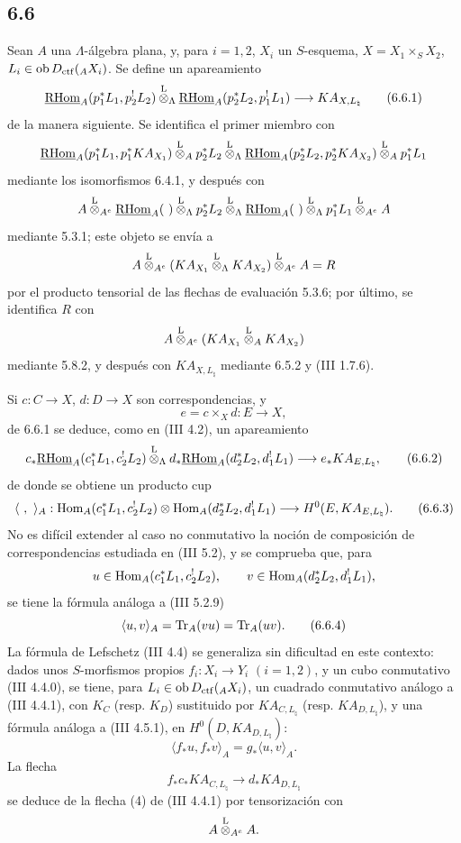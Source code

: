 \subsection*{6.6}
Sean $A$ una $\Lambda$-álgebra plana, y, para $i=1,2$, $X_i$ un $S$-esquema, $X=X_1\times_SX_2$, $L_i\in\operatorname{ob} D_{\mathrm{ctf}}({}_AX_i)$. Se define un apareamiento
\begin{equation}
\underline{\mathrm{RHom}}_A(p_1^*L_1,p_2^!L_2)
\overset{\mathrm L}{\otimes}_{\Lambda}
\underline{\mathrm{RHom}}_A(p_2^*L_2,p_1^!L_1)
\longrightarrow
KA_{X,L_{\natural}}
\tag{6.6.1}
\end{equation}
de la manera siguiente. Se identifica el primer miembro con
\[
\underline{\mathrm{RHom}}_A(p_1^*L_1,p_1^*KA_{X_1})
\overset{\mathrm L}{\otimes}_A p_2^*L_2
\overset{\mathrm L}{\otimes}_{\Lambda}
\underline{\mathrm{RHom}}_A(p_2^*L_2,p_2^*KA_{X_2})
\overset{\mathrm L}{\otimes}_A p_1^*L_1
\]
mediante los isomorfismos 6.4.1, y después con
\[
A\lten_{A^e}\uRHom_A(\ )\lten_{\Lambda}p_2^*L_2
 \lten_{\Lambda}\uRHom_A(\ )\lten_{\Lambda}p_1^*L_1\lten_{A^e}A
\]
mediante 5.3.1; este objeto se envía a
\[
A\overset{\mathrm L}{\otimes}_{A^e}(KA_{X_1}\overset{\mathrm L}{\otimes}_{\Lambda}KA_{X_2})\overset{\mathrm L}{\otimes}_{A^e}A=R
\]
por el producto tensorial de las flechas de evaluación 5.3.6; por último, se identifica $R$ con
\[
A\overset{\mathrm L}{\otimes}_{A^e}(KA_{X_1}\overset{\mathrm L}{\otimes}_A KA_{X_2})
\]
mediante 5.8.2, y después con $KA_{X,L_{\natural}}$ mediante 6.5.2 y (III 1.7.6).

Si $c:C\to X$, $d:D\to X$ son correspondencias, y
\[
e=c\times_Xd:E\to X,
\]
de 6.6.1 se deduce, como en (III 4.2), un apareamiento
\begin{equation}
c_*\underline{\mathrm{RHom}}_A(c_1^*L_1,c_2^!L_2)
\overset{\mathrm L}{\otimes}_{\Lambda}
d_*\underline{\mathrm{RHom}}_A(d_2^*L_2,d_1^!L_1)
\longrightarrow
e_*KA_{E,L_{\natural}},
\tag{6.6.2}
\end{equation}
de donde se obtiene un producto cup
\begin{equation}
\langle\ ,\ \rangle_A:
\operatorname{Hom}_A(c_1^*L_1,c_2^!L_2)\otimes
\operatorname{Hom}_A(d_2^*L_2,d_1^!L_1)
\longrightarrow
H^0(E,KA_{E,L_{\natural}}).
\tag{6.6.3}
\end{equation}
No es difícil extender al caso no conmutativo la noción de composición de correspondencias estudiada en (III 5.2), y se comprueba que, para
\[
u\in\operatorname{Hom}_A(c_1^*L_1,c_2^!L_2),\qquad
v\in\operatorname{Hom}_A(d_2^*L_2,d_1^!L_1),
\]
se tiene la fórmula análoga a (III 5.2.9)
\begin{equation}
\langle u,v\rangle_A=\operatorname{Tr}_A(vu)=\operatorname{Tr}_A(uv).
\tag{6.6.4}
\end{equation}
La fórmula de Lefschetz (III 4.4) se generaliza sin dificultad en este contexto: dados unos $S$-morfismos propios $f_i:X_i\to Y_i$ $(i=1,2)$, y un cubo conmutativo (III 4.4.0), se tiene, para $L_i\in\operatorname{ob} D_{\mathrm{ctf}}({}_AX_i)$, un cuadrado conmutativo análogo a (III 4.4.1), con $K_C$ (resp. $K_D$) sustituido por $KA_{C,L_{\natural}}$ (resp. $KA_{D,L_{\natural}}$), y una fórmula análoga a (III 4.5.1), en $H^0(D,KA_{D,L_{\natural}})$:
\begin{equation}
\langle f_*u,f_*v\rangle_A=g_*\langle u,v\rangle_A.
\tag{6.6.5}
\end{equation}
La flecha
\[
f_*c_*KA_{C,L_{\natural}}\longrightarrow d_*KA_{D,L_{\natural}}
\]
se deduce de la flecha (4) de (III 4.4.1) por tensorización con
\[
A\overset{\mathrm L}{\otimes}_{A^e}A .
\]

